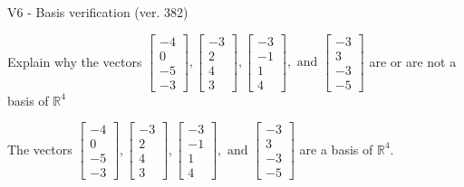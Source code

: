 \begin{exercise}
  \begin{exerciseTitle}V6 - Basis verification (ver. 382)\end{exerciseTitle}
  \begin{exerciseStatement}
    Explain why the vectors \(\left[\begin{array}{r}
-4 \\
0 \\
-5 \\
-3
\end{array}\right] , \left[\begin{array}{r}
-3 \\
2 \\
4 \\
3
\end{array}\right] , \left[\begin{array}{r}
-3 \\
-1 \\
1 \\
4
\end{array}\right] , \text{ and } \left[\begin{array}{r}
-3 \\
3 \\
-3 \\
-5
\end{array}\right]\) are or are not a basis of \(\mathbb{R}^4\)	


  \end{exerciseStatement}
  \begin{exerciseAnswer}
   The vectors \(\left[\begin{array}{r}
-4 \\
0 \\
-5 \\
-3
\end{array}\right] , \left[\begin{array}{r}
-3 \\
2 \\
4 \\
3
\end{array}\right] , \left[\begin{array}{r}
-3 \\
-1 \\
1 \\
4
\end{array}\right] , \text{ and } \left[\begin{array}{r}
-3 \\
3 \\
-3 \\
-5
\end{array}\right]\) 
  	 are  a basis of \(\mathbb{R}^4\).
  


  \end{exerciseAnswer}
\end{exercise}